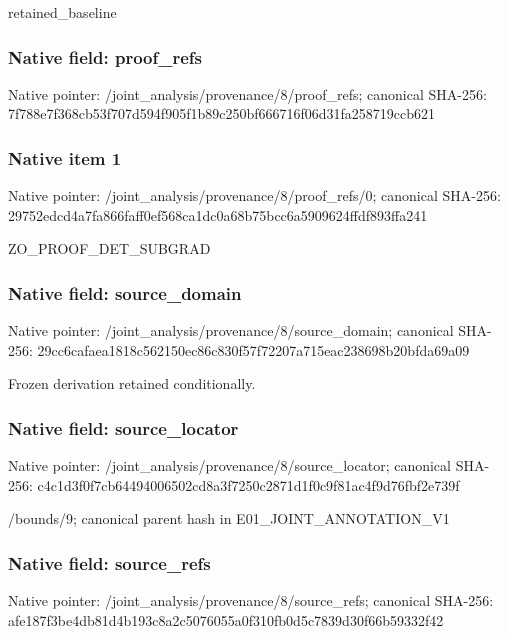 \documentclass[10pt,a4paper]{article}
\begin{document}
\begingroup\raggedright\sloppy retained\_\allowbreak{}baseline\par\endgroup

\subsubsection{Native field: proof\_\allowbreak{}refs}
Native pointer: /joint\_\allowbreak{}analysis/provenance/8/proof\_\allowbreak{}refs; canonical SHA-256: 7f788e7f368cb53f707d594f905f1b89c250bf666716f06d31fa258719ccb621

\subsubsection{Native item 1}
Native pointer: /joint\_\allowbreak{}analysis/provenance/8/proof\_\allowbreak{}refs/0; canonical SHA-256: 29752edcd4a7fa866faff0ef568ca1dc0a68b75bcc6a5909624ffdf893ffa241

\begingroup\raggedright\sloppy ZO\_\allowbreak{}PROOF\_\allowbreak{}DET\_\allowbreak{}SUBGRAD\par\endgroup

\subsubsection{Native field: source\_\allowbreak{}domain}
Native pointer: /joint\_\allowbreak{}analysis/provenance/8/source\_\allowbreak{}domain; canonical SHA-256: 29cc6cafaea1818c562150ec86c830f57f72207a715eac238698b20bfda69a09

\begingroup\raggedright\sloppy Frozen derivation retained conditionally.\par\endgroup

\subsubsection{Native field: source\_\allowbreak{}locator}
Native pointer: /joint\_\allowbreak{}analysis/provenance/8/source\_\allowbreak{}locator; canonical SHA-256: c4c1d3f0f7cb64494006502cd8a3f7250c2871d1f0c9f81ac4f9d76fbf2e739f

\begingroup\raggedright\sloppy /\allowbreak{}bounds/\allowbreak{}9;\allowbreak{} canonical parent hash in E01\_\allowbreak{}JOINT\_\allowbreak{}ANNOTATION\_\allowbreak{}V1\par\endgroup

\subsubsection{Native field: source\_\allowbreak{}refs}
Native pointer: /joint\_\allowbreak{}analysis/provenance/8/source\_\allowbreak{}refs; canonical SHA-256: afe187f3be4db81d4b193c8a2c5076055a0f310fb0d5c7839d30f66b59332f42
\end{document}
